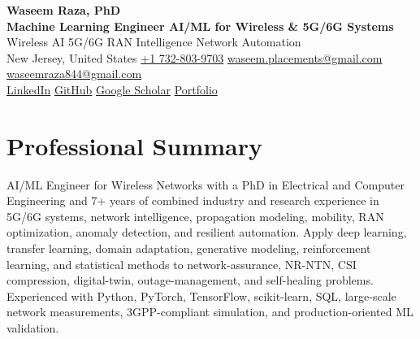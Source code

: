 \documentclass[9pt,letterpaper]{extarticle}
\begin{document}
\begin{center}
{\LARGE\bfseries Waseem Raza, PhD}\\[2pt]
{\large\bfseries Machine Learning Engineer \textbar{} AI/ML for Wireless \& 5G/6G Systems}\\[1pt]
{\small Wireless AI \textbar{} 5G/6G \textbar{} RAN Intelligence \textbar{} Network Automation}\\[3pt]
{\footnotesize New Jersey, United States \quad {}\enspace \href{tel:+17328039703}{+1 732-803-9703} \quad {}\enspace \href{mailto:waseem.placements@gmail.com}{waseem.placements@gmail.com} \textbar{} \href{mailto:waseemraza844@gmail.com}{waseemraza844@gmail.com}\\[1pt]\href{https://www.linkedin.com/in/waseem-raza-phd-9a737858/}{LinkedIn} \textbar{} \href{https://github.com/WaseemRaza844}{GitHub} \textbar{} \href{https://scholar.google.com/citations?user=d58Drr0AAAAJ\&hl=en}{Google Scholar} \textbar{} \href{https://waseemraza844.github.io/portfolio/}{Portfolio}}
\end{center}
\vspace{-5pt}
\section{Professional Summary}
AI/ML Engineer for Wireless Networks with a PhD in Electrical and Computer Engineering and 7+ years of combined industry and research experience in 5G/6G systems, network intelligence, propagation modeling, mobility, RAN optimization, anomaly detection, and resilient automation. Apply deep learning, transfer learning, domain adaptation, generative modeling, reinforcement learning, and statistical methods to network-assurance, NR-NTN, CSI compression, digital-twin, outage-management, and self-healing problems. Experienced with Python, PyTorch, TensorFlow, scikit-learn, SQL, large-scale network measurements, 3GPP-compliant simulation, and production-oriented ML validation.
\end{document}
